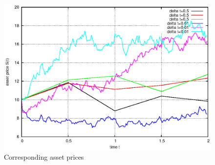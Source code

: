 \documentclass[]{article}
\begin{document}
\begin{figure}[!ht]
\centering
\includegraphics{task10_s}
\caption{Corresponding asset prices}
\label{fig:Task10b}
\end{figure}
\clearpage
\end{document}
